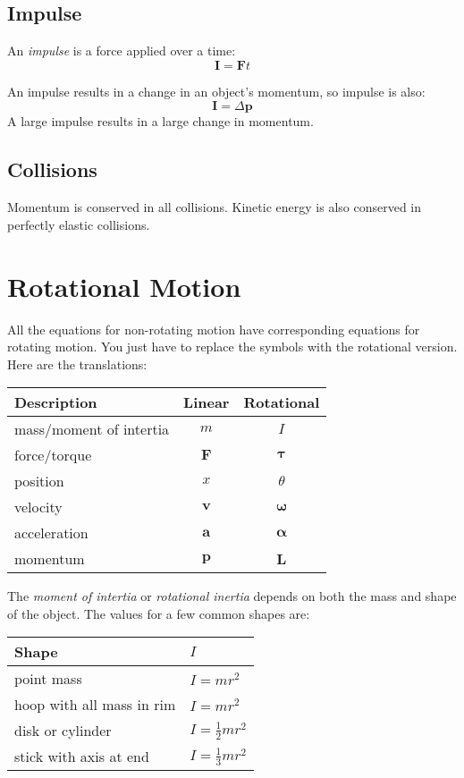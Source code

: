 \documentclass{exam}
\begin{document}
\subsection{Impulse}

An {\em impulse} is a force applied over a time: 
\[
  \mathbf{I} = \mathbf{F}t
\]

An impulse results in a change in an object's momentum, so impulse is also: 
\[
  \mathbf{I} = \Delta \mathbf{p}
\]
A large impulse results in a large change in momentum.

\subsection{Collisions}
Momentum is conserved in all collisions.  Kinetic energy is also conserved in perfectly elastic collisions.

\section{Rotational Motion}
All the equations for non-rotating motion have corresponding equations for rotating motion.  You just have to replace
the symbols with the rotational version.  Here are the translations:

\vspace{.2 in}

\begin{tabular}{lcc}
\toprule
Description & Linear & Rotational \\
\midrule
mass/moment of intertia  & $m$          & $I$   \\
force/torque & $\mathbf{F}$ & $\mathbf{\tau}$   \\
position     & $x$          & $\theta$          \\
velocity     & $\mathbf{v}$ & $\mathbf{\omega}$ \\
acceleration & $\mathbf{a}$ & $\mathbf{\alpha}$ \\
momentum     & $\mathbf{p}$ & $\mathbf{L}$ \\
\bottomrule
\end{tabular}

\vspace{.2 in}

The {\em moment of intertia} or {\em rotational inertia} depends on both the mass and shape of the object.  The values
for a few common shapes are:

\vspace{.2 in}

\begin{tabular}{ll}
\toprule
Shape & $I$ \\
\midrule
point mass  & $I = mr^2$ \\
hoop with all mass in rim   & $I = mr^2$ \\
disk or cylinder   & $I = \frac{1}{2}mr^2$ \\
stick with axis at end   & $I = \frac{1}{3}mr^2$ \\
\bottomrule
\end{tabular}
\end{document}

